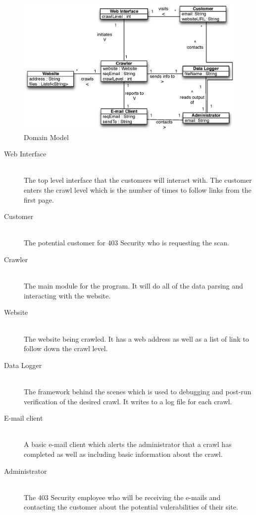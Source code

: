 \documentclass{article}
\begin{document}
\fancyhf{}
\rhead{\today}

\begin{figure}[h]
\includegraphics[width=.9\textwidth]{374DM}
\caption{Domain Model}
\end{figure}

\begin{description}
	\item[Web Interface] \hfill \\
	The top level interface that the customers will interact with.  The customer enters the crawl level which is the number of times to follow links from the first page.
	\item[Customer] \hfill \\
	The potential customer for 403 Security who is requesting the scan.
	\item[Crawler] \hfill \\
	The main module for the program.  It will do all of the data parsing and interacting with the website.
	\item[Website] \hfill \\
	The website being crawled.  It has a web address as well as a list of link to follow down the crawl level.
	\item [Data Logger] \hfill \\
	The framework behind the scenes which is used to debugging and post-run verification of the desired crawl.  It writes to a log file for each crawl.
	\item[E-mail client] \hfill \\
	A basic e-mail client which alerts the administrator that a crawl has completed as well as including basic information about the crawl.
	\item[Administrator] \hfill \\
	The 403 Security employee who will be receiving the e-mails and contacting the customer about the potential vulerabilities of their site.
\end{description}
\end{document}
